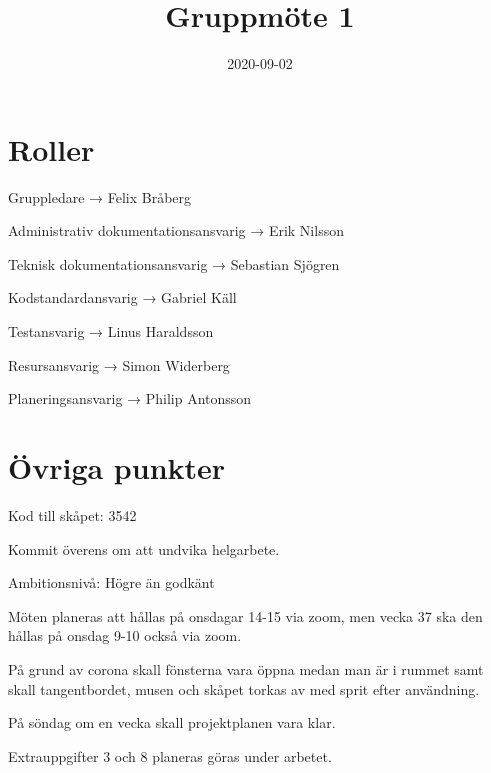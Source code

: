 \documentclass[a4paper]{article}
\begin{document}
\title{Gruppmöte 1}
\date{2020-09-02}
\maketitle

\section*{Roller}
\label{sec:roller}
Gruppledare  → Felix Bråberg

Administrativ dokumentationsansvarig → Erik Nilsson

Teknisk dokumentationsansvarig →  Sebastian Sjögren

Kodstandardansvarig  →  Gabriel Käll

Testansvarig → Linus Haraldsson

Resursansvarig  →  Simon Widerberg

Planeringsansvarig →  Philip Antonsson
\section*{Övriga punkter}
\label{sec:övrigapunkter}

Kod till skåpet: 3542
 

Kommit överens om att undvika helgarbete.
 

Ambitionsnivå: Högre än godkänt
 

Möten planeras att hållas på onsdagar 14-15 via zoom, men vecka 37 ska den hållas på onsdag 9-10 också via zoom.
 

På grund av corona skall fönsterna vara öppna medan man är i rummet samt skall tangentbordet, musen och skåpet torkas av med sprit efter användning.
 

På söndag om en vecka skall projektplanen vara klar.
 

Extrauppgifter 3 och 8 planeras göras under arbetet.
\end{document}
